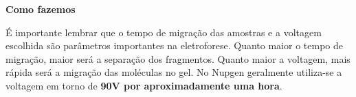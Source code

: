 \documentclass[
  letterpaper,
  DIV=11,
  numbers=noendperiod]{scrreprt}
\begin{document}
\begin{tcolorbox}[enhanced jigsaw, colback=white, toprule=.15mm, rightrule=.15mm, opacityback=0, left=2mm, arc=.35mm, bottomrule=.15mm, breakable, leftrule=.75mm]
\begin{minipage}[t]{5.5mm}
\textcolor{quarto-callout-note-color}{\faInfo}
\end{minipage}%
\begin{minipage}[t]{\textwidth - 5.5mm}

\textbf{Como fazemos}\vspace{2mm}

É importante lembrar que o tempo de migração das amostras e a voltagem
escolhida são parâmetros importantes na eletroforese. Quanto maior o
tempo de migração, maior será a separação dos fragmentos. Quanto maior a
voltagem, mais rápida será a migração das moléculas no gel. No Nupgen
geralmente utiliza-se a voltagem em torno de \textbf{90V por
aproximadamente uma hora}.

\end{minipage}%
\end{tcolorbox}
\end{document}
